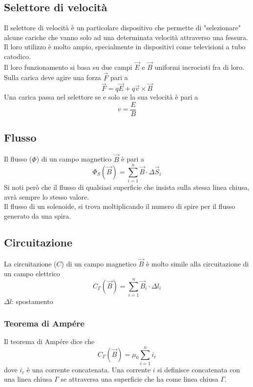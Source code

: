 \subsection{Selettore di velocità}
Il selettore di velocità è un particolare dispositivo che permette di "selezionare" alcune cariche che
vanno solo ad una determinata velocità attraverso una fessura. Il loro utilizzo è molto ampio, 
specialmente in dispositivi come televisioni a tubo catodico.\\
Il loro funzionamento si basa su due campi $\vec{E}$ e $\vec{B}$ uniformi incrociati fra di loro.\\
Sulla carica deve agire una forza $\vec{F}$ pari a
\begin{equation*}
  \vec{F} = q\vec{E} + q\vec{v}\times\vec{B}
\end{equation*}
Una carica passa nel selettore se e solo se la sua velocità è pari a
\begin{equation*}
  v = \frac{E}{B}
\end{equation*}

\subsection{Flusso}
Il flusso ($\Phi$) di un campo magnetico $\vec{B}$ è pari a 
\begin{equation*}
  \Phi_S(\vec{B}) = \sum^n_{i=1} \vec{B}\cdot\Delta\vec{S}_i
\end{equation*}
Si noti però che il flusso di qualsiasi superficie che insista sulla stessa linea chiusa, avrà
sempre lo stesso valore.\\
Il flusso di un solenoide, si trova moltiplicando il numero di spire per il flusso generato da una
spira.

\subsection{Circuitazione}
La circuitazione ($C$) di un campo magnetico $\vec{B}$ è molto simile alla circuitazione
di un campo elettrico
\begin{equation*}
  C_\Gamma(\vec{B}) = \sum^{n}_{i=1}\vec{B}_i\cdot\Delta l_i
\end{equation*}
$\Delta l$: spostamento

\subsubsection{Teorema di Ampére}
Il teorema di Ampére dice che
\begin{equation*}
  C_\Gamma(\vec{B}) = \mu_0 \sum\limits^{n}_{i=1} i_c
\end{equation*}
dove $i_c$ è una corrente concatenata. Una corrente $i$ si definisce concatenata con una linea
chiusa $\Gamma$ se attraversa una superficie che ha come linea chiusa $\Gamma$.

